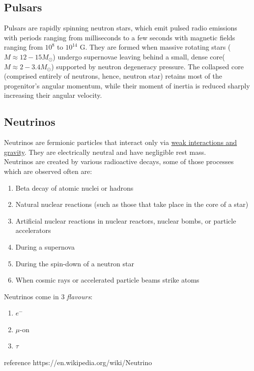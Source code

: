 \documentclass{article}
\begin{document}
\subsection{\large Pulsars}
Pulsars are rapidly spinning neutron stars, which emit pulsed radio emissions with periods ranging from  milliseconds to a few seconds  with  magnetic fields ranging from $10^8$ to $10^{14}$ G. They are formed when massive rotating stars ($M \approx 12 - 15 M_\odot$) undergo supernovae leaving behind a small, dense core($M \approx 2 - 3.4 M_\odot$) supported by neutron degeneracy pressure. The collapsed core (comprised entirely of neutrons, hence, neutron star) retains most of the progenitor's angular momentum, while their moment of inertia is reduced sharply increasing their angular velocity.
\subsection{\large Neutrinos}
Neutrinos are fermionic particles that interact only via \underline{weak interactions and gravity}.
They are electrically neutral and have negligible rest mass.\\
Neutrinos are created by various radioactive decays, some of those  processes which are observed often are:
\begin{enumerate}
    \item Beta decay of atomic nuclei or hadrons
    \item Natural nuclear reactions (such as those that take place in the core of a star)
    \item Artificial nuclear reactions in nuclear reactors, nuclear bombs, or particle accelerators
    \item During a supernova
    \item During the spin-down of a neutron star
    \item When cosmic rays or accelerated particle beams strike atoms
\end{enumerate}
Neutrinos come in 3 \emph{flavours}:
\begin{enumerate}
    \item $e^- $
    \item $\mu$-on
    \item $\tau$
\end{enumerate}
reference https://en.wikipedia.org/wiki/Neutrino
\end{document}
